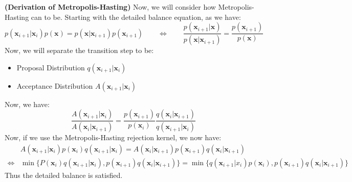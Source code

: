 \begin{remark}{\textbf{(Derivation of Metropolis-Hasting)}}
    Now, we will consider how Metropolis-Hasting can to be. Starting with the detailed balance equation, as we have:
    \begin{equation*}
        p(\boldsymbol x_{i+1} | \boldsymbol x_i)p(\boldsymbol x) = p(\boldsymbol x|\boldsymbol x_{i+1})p(\boldsymbol x_{i+1}) \qquad \iff \qquad \frac{p(\boldsymbol x_{i+1}|\boldsymbol x)}{p(\boldsymbol x|\boldsymbol x_{i+1})} = \frac{p(\boldsymbol x_{i+1})}{p(\boldsymbol x)}
    \end{equation*}
    Now, we will separate the transition step to be:
    \begin{itemize}
        \item Proposal Distribution $q(\boldsymbol x_{i+1} | \boldsymbol x_i)$
        \item Acceptance Distribution $A(\boldsymbol x_{i+1} | \boldsymbol x_i)$
    \end{itemize}
    Now, we have:
    \begin{equation*}
        \frac{A(\boldsymbol x_{i+1} | \boldsymbol x_i)}{A(\boldsymbol x_i | \boldsymbol x_{i+1})} = \frac{p(\boldsymbol x_{i+1})}{p(\boldsymbol x_i)}\frac{q(\boldsymbol x_i | \boldsymbol x_{i+1})}{q(\boldsymbol x_{i+1} | \boldsymbol x_i)}
    \end{equation*}
    Now, if we use the Metropolis-Hasting rejection kernel, we now have:
    \begin{equation*}
    \begin{aligned}
        &A(\boldsymbol x_{i+1} | \boldsymbol x_i) p(\boldsymbol x_i)q(\boldsymbol x_{i+1} | \boldsymbol x_i) = A(\boldsymbol x_i|\boldsymbol x_{i+1})p(\boldsymbol x_{i+1})q(\boldsymbol x_i|\boldsymbol x_{i+1}) \\
        \iff&\min\Big\{ P(\boldsymbol x_i)q(\boldsymbol x_{i+1} | \boldsymbol x_i), p(\boldsymbol x_{i+1})q(\boldsymbol x_i|\boldsymbol x_{i+1}) \Big\} = \min\Big\{ q(\boldsymbol x_{i+1}|x_i)p(\boldsymbol x_i), p(\boldsymbol x_{i+1})q(\boldsymbol x_i|\boldsymbol x_{i+1}) \Big\}
    \end{aligned}
    \end{equation*}
    Thus the detailed balance is satisfied. 
\end{remark}

